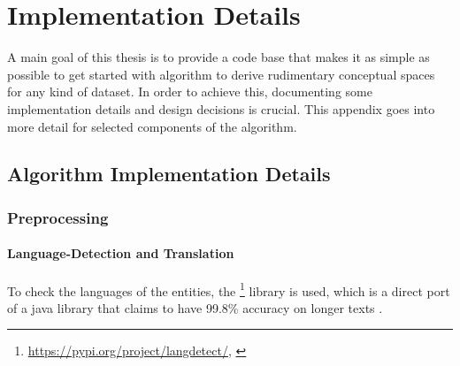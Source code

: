 




\chapter{Implementation Details} %

A main goal of this thesis is to provide a code base that makes it as simple as possible to get started with  algorithm to derive rudimentary conceptual spaces for any kind of dataset. In order to achieve this, documenting some implementation details and design decisions is crucial.
This appendix goes into more detail for selected components of the algorithm.

\label{AppendixB} 

\section{Algorithm Implementation Details}

\subsection*{Preprocessing}

\subsubsection*{Language-Detection and Translation}
\label{ap:translating}

To check the languages of the entities, the \footnote{\url{https://pypi.org/project/langdetect/}, \textcite{nakatani2010langdetect}} library is used, which is a direct port of a java library that claims to have 99.8\% accuracy on longer texts \cite{nakatani2010langdetect}. 

